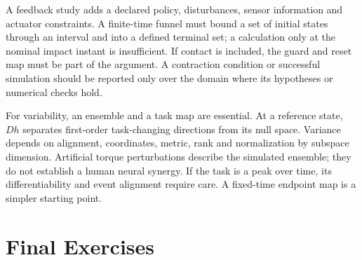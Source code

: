 A feedback study adds a declared policy, disturbances, sensor information and
actuator constraints. A finite-time funnel must bound a set of initial states
through an interval and into a defined terminal set; a calculation only at the
nominal impact instant is insufficient. If contact is included, the guard and
reset map must be part of the argument. A contraction condition or successful
simulation should be reported only over the domain where its hypotheses or
numerical checks hold.

For variability, an ensemble and a task map are essential. At a reference state,
$D h$ separates first-order task-changing directions from its null space.
Variance depends on alignment, coordinates, metric, rank and normalization by
subspace dimension. Artificial torque perturbations describe the simulated
ensemble; they do not establish a human neural synergy. If the task is a peak
over time, its differentiability and event alignment require care. A fixed-time
endpoint map is a simpler starting point.

\section*{Final Exercises}

